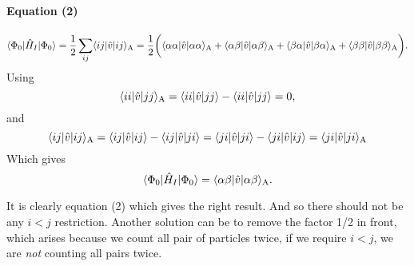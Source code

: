 \documentclass[a4paper, 11pt, notitlepage, english]{article}
\newcommand{\op}[1]{\hat{#1}}
\newcommand{\braopket}[3]{\langle #1 | {#2} | #3 \rangle}
\begin{document}
\paragraph{Equation (2)}
$$\braopket{\Phi_0}{\op{H}_I}{\Phi_0} =  \frac{1}{2}\sum_{ij} \braopket{ij}{\op{v}}{ij}_{\rm A} = \frac{1}{2}\bigg(\braopket{\alpha\alpha}{\op{v}}{\alpha\alpha}_{\rm A} + \braopket{\alpha\beta}{\op{v}}{\alpha\beta}_{\rm A} + \braopket{\beta\alpha}{\op{v}}{\beta\alpha}_{\rm A} + \braopket{\beta\beta}{\op{v}}{\beta\beta}_{\rm A}\bigg).$$
Using 
$$\braopket{ii}{\op{v}}{jj}_{\rm A} = \braopket{ii}{\op{v}}{jj} - \braopket{ii}{\op{v}}{jj} = 0,$$
and
$$\braopket{ij}{\op{v}}{ij}_{\rm A} = \braopket{ij}{\op{v}}{ij} - \braopket{ij}{\op{v}}{ji} = \braopket{ji}{\op{v}}{ji} - \braopket{ji}{\op{v}}{ij} = \braopket{ji}{\op{v}}{ji}_{\rm A} $$
Which gives
$$\braopket{\Phi_0}{\op{H}_I}{\Phi_0} = \braopket{\alpha\beta}{\op{v}}{\alpha\beta}_{\rm A}.$$

It is clearly equation (2) which gives the right result. And so there should not be any $i<j$ restriction. Another solution can be to remove the factor 1/2 in front, which arises because we count all pair of particles twice, if we require $i<j$, we are \emph{not} counting all pairs twice.
\end{document}
